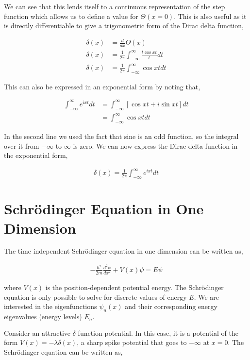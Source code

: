 \documentclass[11pt]{amsart}
\begin{document}
We can see that this lends itself to a continuous representation of the step function which allows us to define a value for $\Theta(x = 0)$. This is also useful as it is directly differentiable to give a trigonometric form of the Dirac delta function,

\begin{align*}
  \delta(x) &= \frac{d}{dx}\Theta(x) \\
  \delta(x) &= \frac{1}{2\pi} \int_{-\infty}^{\infty} \frac{t \cos xt}{t} dt \\
  \delta(x) &= \frac{1}{2\pi} \int_{-\infty}^{\infty} \cos xt dt
\end{align*}

This can also be expressed in an exponential form by noting that,

\begin{align*}
  \int_{-\infty}^{\infty} e^{ixt} dt &= \int_{-\infty}^{\infty} \left[\cos xt + i\sin xt\right] dt \\
                                     &= \int_{-\infty}^{\infty} \cos xt dt
\end{align*}

In the second line we used the fact that sine is an odd function, so the integral over it from $-\infty$ to $\infty$ is zero. We can now express the Dirac delta function in the exponential form,

\begin{align*}
  \delta(x) = \frac{1}{2\pi} \int_{-\infty}^{\infty} e^{ixt} dt
\end{align*}


\section{Schr\"{o}dinger Equation in One Dimension}

The time independent Schr\"{o}dinger equation in one dimension can be written as,

\begin{align*}
  -\frac{\hbar^2}{2m}\frac{d^2\psi}{dx^2} + V(x)\psi = E\psi
\end{align*}

where $V(x)$ is the position-dependent potential energy. The Schr\"{o}dinger equation is only possible to solve for discrete values of energy $E$. We are interested in the eigenfunctions $\psi_n(x)$ and their corresponding energy eigenvalues (energy levels) $E_n$.

Consider an attractive $\delta$-function potential. In this case, it is a potential of the form $V(x) = -\lambda\delta(x)$, a sharp spike potential that goes to $-\infty$ at $x = 0$. The Schr\"{o}dinger equation can be written as,
\end{document}
